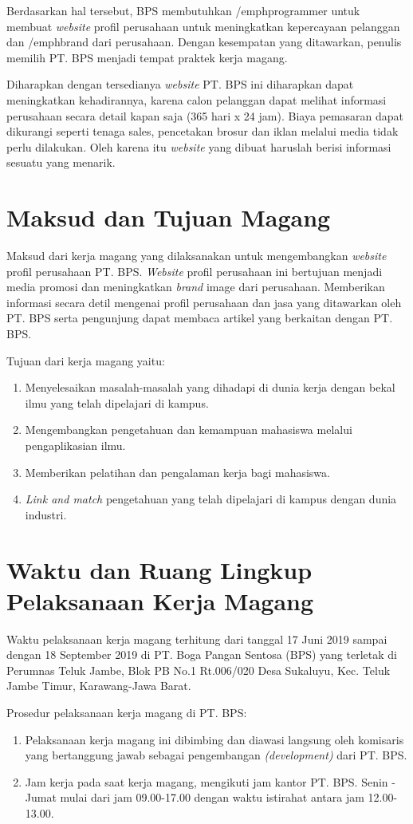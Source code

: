 Berdasarkan hal tersebut, BPS membutuhkan /emph{programmer} 
untuk membuat \emph{website} profil perusahaan 
untuk meningkatkan kepercayaan pelanggan dan /emph{brand} dari perusahaan. 
Dengan kesempatan yang ditawarkan, penulis memilih PT. BPS menjadi tempat praktek kerja magang.

Diharapkan dengan tersedianya \emph{website} PT. BPS ini 
diharapkan dapat meningkatkan kehadirannya, 
karena calon pelanggan dapat melihat informasi perusahaan secara detail kapan saja (365 hari x 24 jam). 
Biaya pemasaran dapat dikurangi seperti tenaga sales, 
pencetakan brosur dan iklan melalui media tidak perlu dilakukan. 
Oleh karena itu \emph{website} yang dibuat haruslah berisi informasi sesuatu yang menarik.

\section{Maksud dan Tujuan Magang}

Maksud dari kerja magang yang dilaksanakan untuk 
mengembangkan \emph{website} profil perusahaan 
PT. BPS. \emph{Website} profil perusahaan ini bertujuan menjadi media promosi dan meningkatkan \emph{brand}
image dari perusahaan. Memberikan informasi secara detil 
mengenai profil perusahaan dan jasa yang ditawarkan oleh PT. BPS serta 
pengunjung dapat membaca artikel yang berkaitan dengan PT. BPS.

\noindent Tujuan dari kerja magang yaitu:

\begin{enumerate}
\item Menyelesaikan masalah-masalah yang dihadapi di dunia kerja dengan bekal ilmu yang telah dipelajari di kampus.
\item Mengembangkan pengetahuan dan kemampuan mahasiswa melalui pengaplikasian ilmu.
\item Memberikan pelatihan dan pengalaman kerja bagi mahasiswa.
\item \emph{Link and match} pengetahuan yang telah dipelajari di kampus dengan dunia industri.
\end{enumerate}

\section{Waktu dan Ruang Lingkup Pelaksanaan Kerja Magang}

Waktu pelaksanaan kerja magang terhitung dari tanggal 
17 Juni 2019 sampai dengan 18 September 2019 di 
PT. Boga Pangan Sentosa (BPS) yang terletak di 
Perumnas Teluk Jambe, Blok PB No.1 Rt.006/020 Desa Sukaluyu, 
Kec. Teluk Jambe Timur, Karawang-Jawa Barat.

\noindent Prosedur pelaksanaan kerja magang di PT. BPS:
\nolinebreak
\begin{enumerate}
\item Pelaksanaan kerja magang ini dibimbing dan diawasi langsung oleh komisaris yang 
bertanggung jawab sebagai pengembangan \emph{(development)} dari PT. BPS. 
\item Jam kerja pada saat kerja magang, mengikuti jam kantor PT. BPS. 
Senin - Jumat mulai dari jam 09.00-17.00 dengan waktu istirahat antara jam 12.00-13.00. 
\end{enumerate}